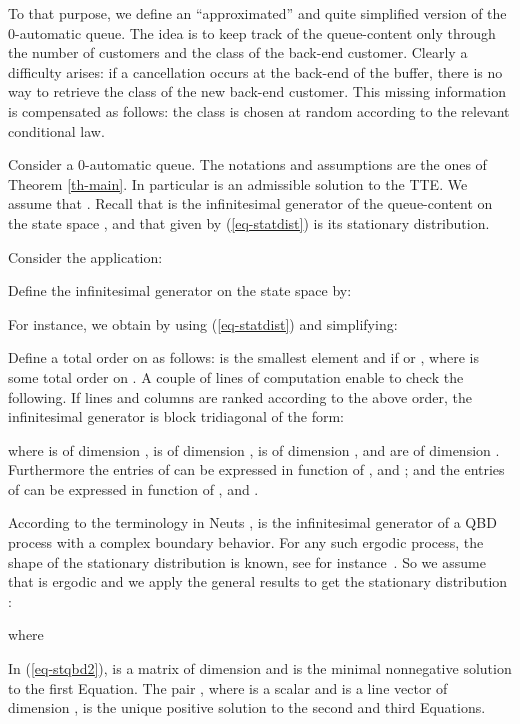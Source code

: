 \documentclass[11pt,a4paper]{article}
\theoremstyle{remark}
\def\eref#1{(\ref{#1})}
\begin{document}
\medskip

To that purpose, we define an  ``approximated'' and quite
simplified version of the 0-automatic queue. The idea is to keep
track of the queue-content only through the number of customers
and the class of the back-end customer. Clearly a difficulty
arises: if a cancellation occurs at the back-end of the buffer,
there is no way to retrieve the class of the new back-end
customer. This missing information is compensated as follows: the
class is chosen at random according to the relevant conditional
law.

\medskip

Consider a 0-automatic queue. The notations and assumptions are the
ones of Theorem \ref{th-main}. In particular  is an
admissible solution to the TTE. We assume that .  Recall that  is the infinitesimal
generator of the queue-content on the state space
, and that  given by \eref{eq-statdist} is its stationary
distribution.

Consider the application:

Define the infinitesimal generator  on the state space
 by:

For instance, we obtain by using \eref{eq-statdist} and simplifying:


Define a total order on  as
follows:  is the smallest element and  if  or , where  is some total order on
. A couple of lines of computation enable to check the
following. If lines and columns are ranked according to the above
order, the infinitesimal generator  is block
tridiagonal of the form:

where  is of dimension ,  is of dimension ,  is
of dimension , and  are of dimension
. Furthermore the entries of  can be
expressed in function of , and ; and the entries of
 can be expressed in function of
, and .

\medskip

According to the terminology in Neuts \cite{neut}, 
is the infinitesimal generator of a QBD
process with a complex boundary behavior. For any such ergodic
process, the shape of the stationary
distribution is known, see for instance~\cite[Chapter
  1.5]{neut}. So we assume that  is ergodic and we
apply the general results to get the stationary
distribution :

where

In \eref{eq-stqbd2},  is a matrix of dimension  and
is the minimal nonnegative solution to the first Equation. The pair
, where  is a scalar and  is a line
vector of dimension , is the unique positive solution to
the second and third Equations.
\end{document}
